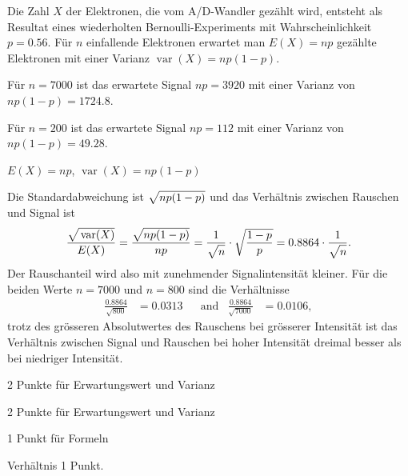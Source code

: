 \begin{loesung}
Die Zahl $X$ der Elektronen, die vom A/D-Wandler gezählt wird, entsteht
als Resultat eines wiederholten Bernoulli-Experiments mit Wahrscheinlichkeit
$p=0.56$.
Für $n$ einfallende Elektronen erwartet man $E(X)=np$ gezählte Elektronen
mit einer Varianz $\operatorname{var}(X)=np(1-p)$.
\begin{teilaufgaben}
\item
Für $n=7000$ ist das erwartete Signal $np=3920$ mit einer Varianz
von $np(1-p)=1724.8$.
\item
Für $n=200$ ist das erwartete Signal $np=112$ mit einer Varianz von
$np(1-p)=49.28$.
\item
$E(X)=np$, $\operatorname{var}(X)=np(1-p)$
\item
Die Standardabweichung ist $\sqrt{\mathstrut np(1-p)}$ und das Verhältnis
zwischen Rauschen und Signal ist
\[
\frac{\sqrt{\mathstrut\operatorname{var}(X)}}{E(X)}
=
\frac{\sqrt{\mathstrut np(1-p)}}{np}
=
\frac{1}{\sqrt{\mathstrut n}}
\cdot
\sqrt{\frac{1-p}{p}}
=
0.8864\cdot\frac{1}{\sqrt{n\mathstrut}}.
\]
Der Rauschanteil wird also mit zunehmender Signalintensität kleiner.
Für die beiden Werte $n=7000$ und $n=800$ sind die Verhältnisse
\begin{align*}
\frac{0.8864}{\sqrt{800}} &= 0.0313
&
&\text{and}&
\frac{0.8864}{\sqrt{7000}} &= 0.0106,
\end{align*}
trotz des grösseren Absolutwertes des Rauschens bei grösserer Intensität
ist das Verhältnis zwischen Signal und Rauschen bei hoher Intensität
dreimal besser als bei niedriger Intensität.
\qedhere
\end{teilaufgaben}
\end{loesung}

\begin{bewertung}
\begin{teilaufgaben}
\item 2 Punkte für Erwartungswert und Varianz
\item 2 Punkte für Erwartungswert und Varianz
\item 1 Punkt für Formeln
\item Verhältnis 1 Punkt.
\end{teilaufgaben}
\end{bewertung}


